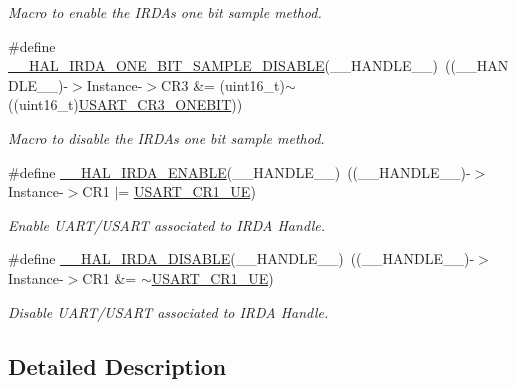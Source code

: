 \begin{DoxyCompactItemize}
\begin{DoxyCompactList}\small\item\em Macro to enable the I\+R\+DA\textquotesingle{}s one bit sample method. \end{DoxyCompactList}\item 
\#define \hyperlink{group___i_r_d_a___exported___macros_ga68c1c53595fe30df9e25d6bfea0c421f}{\+\_\+\+\_\+\+H\+A\+L\+\_\+\+I\+R\+D\+A\+\_\+\+O\+N\+E\+\_\+\+B\+I\+T\+\_\+\+S\+A\+M\+P\+L\+E\+\_\+\+D\+I\+S\+A\+B\+LE}(\+\_\+\+\_\+\+H\+A\+N\+D\+L\+E\+\_\+\+\_\+)~((\+\_\+\+\_\+\+H\+A\+N\+D\+L\+E\+\_\+\+\_\+)-\/$>$Instance-\/$>$C\+R3 \&= (uint16\+\_\+t)$\sim$((uint16\+\_\+t)\hyperlink{group___peripheral___registers___bits___definition_ga9a96fb1a7beab602cbc8cb0393593826}{U\+S\+A\+R\+T\+\_\+\+C\+R3\+\_\+\+O\+N\+E\+B\+IT}))
\begin{DoxyCompactList}\small\item\em Macro to disable the I\+R\+DA\textquotesingle{}s one bit sample method. \end{DoxyCompactList}\item 
\#define \hyperlink{group___i_r_d_a___exported___macros_ga94d14e3105494108f4ba6f69aa1728a7}{\+\_\+\+\_\+\+H\+A\+L\+\_\+\+I\+R\+D\+A\+\_\+\+E\+N\+A\+B\+LE}(\+\_\+\+\_\+\+H\+A\+N\+D\+L\+E\+\_\+\+\_\+)~((\+\_\+\+\_\+\+H\+A\+N\+D\+L\+E\+\_\+\+\_\+)-\/$>$Instance-\/$>$C\+R1 $\vert$=  \hyperlink{group___peripheral___registers___bits___definition_ga2bb650676aaae4a5203f372d497d5947}{U\+S\+A\+R\+T\+\_\+\+C\+R1\+\_\+\+UE})
\begin{DoxyCompactList}\small\item\em Enable U\+A\+R\+T/\+U\+S\+A\+RT associated to I\+R\+DA Handle. \end{DoxyCompactList}\item 
\#define \hyperlink{group___i_r_d_a___exported___macros_gaf049a81f535415532182a2bb10cbee1d}{\+\_\+\+\_\+\+H\+A\+L\+\_\+\+I\+R\+D\+A\+\_\+\+D\+I\+S\+A\+B\+LE}(\+\_\+\+\_\+\+H\+A\+N\+D\+L\+E\+\_\+\+\_\+)~((\+\_\+\+\_\+\+H\+A\+N\+D\+L\+E\+\_\+\+\_\+)-\/$>$Instance-\/$>$C\+R1 \&=  $\sim$\hyperlink{group___peripheral___registers___bits___definition_ga2bb650676aaae4a5203f372d497d5947}{U\+S\+A\+R\+T\+\_\+\+C\+R1\+\_\+\+UE})
\begin{DoxyCompactList}\small\item\em Disable U\+A\+R\+T/\+U\+S\+A\+RT associated to I\+R\+DA Handle. \end{DoxyCompactList}\end{DoxyCompactItemize}


\subsection{Detailed Description}


